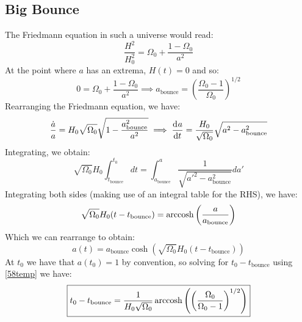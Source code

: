 \subsection{Big Bounce}
The Friedmann equation in such a universe would read:
\begin{equation}\label{Freid58}
    \frac{H^2}{H_0^2} = \Omega_0 + \frac{1 - \Omega_0}{a^2}
\end{equation}
At the point where $a$ has an extrema, $H(t) = 0$ and so:
\begin{equation}
    0 = \Omega_0 + \frac{1 - \Omega_0}{a^2} \implies \boxed{a_{\text{bounce}} = \left(\frac{\Omega_0 - 1}{\Omega_0}\right)^{1/2}}
\end{equation}
Rearranging the Friedmann equation, we have:
\begin{equation}
    \frac{\dot{a}}{a} = H_0\sqrt{\Omega_0}\sqrt{1 - \frac{a_{\text{bounce}}^2}{a^2}} \implies \dod{a}{t} = \frac{H_0}{\sqrt{\Omega_0}}\sqrt{a^2 - a^2_{\text{bounce}}}
\end{equation}
Integrating, we obtain:
\begin{equation}
   \sqrt{\Omega_0} H_0\int_{t_{\text{bounce}}}^{t_0} dt = \int_{a_{\text{bounce}}}^a \frac{1}{\sqrt{a'^2 - a^2_{\text{bounce}}}} da'
\end{equation}
Integrating both sides (making use of an integral table for the RHS), we have:
\begin{equation}\label{58temp}
    \sqrt{\Omega_0} H_0(t - t_{\text{bounce}}) = \operatorname{arccosh}\left(\frac{a}{a_{\text{bounce}}}\right)
\end{equation}
Which we can rearrange to obtain:
\begin{equation}
    \boxed{a(t) = a_{\text{bounce}}\cosh\left(\sqrt{\Omega_0} H_0(t - t_{\text{bounce}})\right)}
\end{equation}
At $t_0$ we have that $a(t_0) = 1$ by convention, so solving for $t_0 - t_{\text{bounce}}$ using \eqref{58temp} we have:
\begin{equation}
    \boxed{t_0 - t_{\text{bounce}} = \frac{1}{H_0\sqrt{\Omega_0}}\operatorname{arccosh}\left(\left(\frac{\Omega_0}{\Omega_0 - 1}\right)^{1/2}\right)}
\end{equation}

